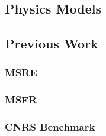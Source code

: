 \subsection{Physics Models}

\subsection{Previous Work}

\subsubsection{MSRE}

\subsubsection{MSFR}

\subsubsection{CNRS Benchmark}